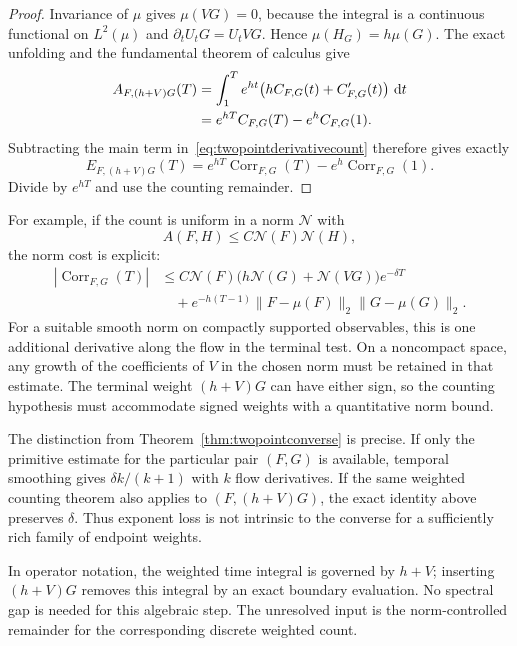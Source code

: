 \documentclass[11pt,a4paper]{article}
\numberwithin{equation}{section}
\theoremstyle{definition}
\theoremstyle{remark}
\newcommand{\dd}{\mathop{}\!\mathrm d}
\begin{document}
\begin{proof}
Invariance of $\mu$ gives $\mu(VG)=0$, because the integral is a
continuous functional on $L^2(\mu)$ and
$\partial_tU_tG=U_tVG$. Hence $\mu(H_G)=h\mu(G)$.
The exact unfolding and the fundamental theorem of calculus give
\begin{align}
 A_{F,(h+V)G}(T)
  &=\int_1^T e^{ht}
       \bigl(hC_{F,G}(t)+C_{F,G}'(t)\bigr)\,\dd t\notag\\
  &=e^{hT}C_{F,G}(T)-e^h C_{F,G}(1).
 \label{eq:twopointfundamental}
\end{align}
Subtracting the main term in~\eqref{eq:twopointderivativecount}
therefore gives exactly
\begin{equation}
 E_{F,(h+V)G}(T)
  =e^{hT}\operatorname{Corr}_{F,G}(T)
       -e^h\operatorname{Corr}_{F,G}(1).
 \label{eq:twopointfullidentity}
\end{equation}
Divide by $e^{hT}$ and use the counting remainder.
\end{proof}

For example, if the count is uniform in a norm $\mathcal N$ with
\[
 A(F,H)\leq C\mathcal N(F)\mathcal N(H),
\]
the norm cost is explicit:
\begin{equation}
 \begin{split}
 |\operatorname{Corr}_{F,G}(T)|
 &\leq C\mathcal N(F)
       \bigl(h\mathcal N(G)+\mathcal N(VG)\bigr)e^{-\delta T}\\
 &\quad+e^{-h(T-1)}
       \|F-\mu(F)\|_2\|G-\mu(G)\|_2.
 \end{split}
 \label{eq:twopointfullnorm}
\end{equation}
For a suitable smooth norm on compactly supported observables,
this is one additional derivative along the flow in the terminal
test. On a noncompact space, any growth of the coefficients of
$V$ in the chosen norm must be retained in that estimate.
The terminal weight $(h+V)G$ can have either sign, so the counting
hypothesis must accommodate signed weights with a quantitative
norm bound.

The distinction from Theorem~\ref{thm:twopointconverse} is precise.
If only the primitive estimate for the particular pair $(F,G)$ is
available, temporal smoothing gives $\delta k/(k+1)$ with $k$
flow derivatives. If the same weighted counting theorem also
applies to $(F,(h+V)G)$, the exact identity above preserves
$\delta$. Thus exponent loss is not intrinsic to the converse
for a sufficiently rich family of endpoint weights.

In operator notation, the weighted time integral is governed by
$h+V$; inserting $(h+V)G$ removes this integral by an exact
boundary evaluation. No spectral gap is needed for this
algebraic step. The unresolved input is the norm-controlled
remainder for the corresponding discrete weighted count.
\end{document}

